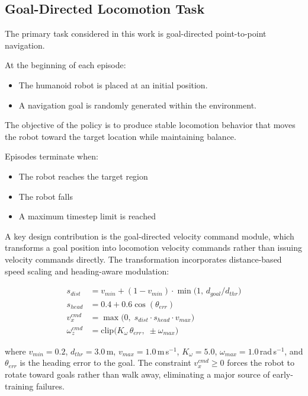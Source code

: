 \documentclass[pdflatex,sn-mathphys-num]{sn-jnl}%
\theoremstyle{thmstyleone}%
\theoremstyle{thmstyletwo}%
\theoremstyle{thmstylethree}%
\begin{document}
\subsection{Goal-Directed Locomotion Task}
The primary task considered in this work is goal-directed point-to-point navigation.

At the beginning of each episode:
\begin{itemize}
    \item The humanoid robot is placed at an initial position.
    \item A navigation goal is randomly generated within the environment.
\end{itemize}

The objective of the policy is to produce stable locomotion behavior that moves the robot toward the target location while maintaining balance.

Episodes terminate when:
\begin{itemize}
    \item The robot reaches the target region
    \item The robot falls
    \item A maximum timestep limit is reached
\end{itemize}

A key design contribution is the goal-directed velocity command module, which
transforms a goal position into locomotion velocity commands rather than issuing
velocity commands directly.
The transformation incorporates distance-based speed scaling and heading-aware
modulation:

\begin{align}
s_{dist}  &= v_{min} + (1-v_{min})\cdot\min\!\bigl(1,\,d_{goal}/d_{thr}\bigr)
\label{eq:sdist} \\
s_{head}  &= 0.4 + 0.6\cos(\theta_{err})
\label{eq:shead} \\
v_x^{cmd} &= \max\!\bigl(0,\;s_{dist}\cdot s_{head}\cdot v_{max}\bigr)
\label{eq:vcmd} \\
\omega_z^{cmd} &= \mathrm{clip}\!\bigl(K_\omega\,\theta_{err},\;\pm\omega_{max}\bigr)
\label{eq:wcmd}
\end{align}

where $v_{min}=0.2$, $d_{thr}=3.0$\,m, $v_{max}=1.0$\,m\,s$^{-1}$,
$K_\omega=5.0$, $\omega_{max}=1.0$\,rad\,s$^{-1}$, and $\theta_{err}$ is the
heading error to the goal.
The constraint $v_x^{cmd}\geq 0$ forces the robot to rotate toward goals rather
than walk away, eliminating a major source of early-training failures.
\end{document}
